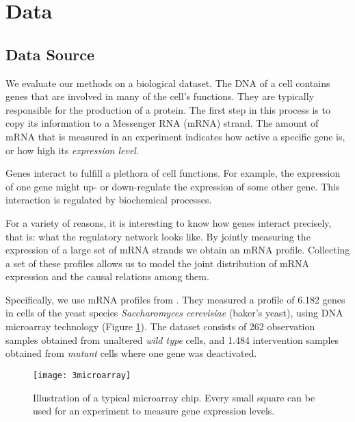 \newpage
\section{Data}


\subsection{Data Source}

We evaluate our methods on a biological dataset. The DNA of a cell contains genes that are involved in many of the cell's functions. They are typically responsible for the production of a protein. The first step in this process is to copy its information to a Messenger RNA (mRNA) strand. The amount of mRNA that is measured in an experiment indicates how active a specific gene is, or how high its \textit{expression level}.

Genes interact to fulfill a plethora of cell functions. For example, the expression of one gene might up- or down-regulate the expression of some other gene. This interaction is regulated by biochemical processes. 

For a variety of reasons, it is interesting to know how genes interact precisely, that is: what the regulatory network looks like. By jointly measuring the expression of a large set of mRNA strands we obtain an mRNA profile. Collecting a set of these profiles allows us to model the joint distribution of mRNA expression and the causal relations among them.

Specifically, we use mRNA profiles from \citet{kemmeren2014large}. They measured a profile of 6.182 genes in cells of the yeast species \textit{Saccharomyces cerevisiae} (baker's yeast), using DNA microarray technology (Figure \ref{fig:3:microarray}). The dataset consists of 262 observation samples obtained from unaltered \textit{wild type} cells, and 1.484 intervention samples obtained from \textit{mutant} cells where one gene was deactivated.

\begin{figure}[h]
    \centering
    \texttt{[image: 3microarray]}
    \caption{Illustration of a typical microarray chip. Every small square can be used for an experiment to measure gene expression levels.\protect\footnotemark}
    \label{fig:3:microarray}
\end{figure}

